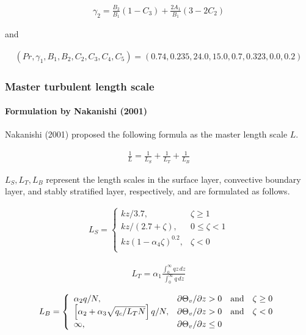 \begin{eqnarray}\gamma_2=\frac{B_2}{B_1}\left(1-C_3\right)+\frac{2A_1}{B_1}\left(3-2C_2\right)\end{eqnarray}

and

\begin{eqnarray}
(Pr,\gamma_1,B_1,B_2,C_2,C_3,C_4,C_5)=(0.74,0.235,24.0,15.0,0.7,0.323,0.0,0.2)
\end{eqnarray}

\hypertarget{master-turbulent-length-scale}{%
\subsubsection{Master turbulent length
scale}\label{master-turbulent-length-scale}}

\hypertarget{formulation-by-nakanishi-2001}{%
\paragraph{Formulation by Nakanishi
(2001)}\label{formulation-by-nakanishi-2001}}

Nakanishi (2001) proposed the following formula as the master length
scale \(L\).

\begin{eqnarray}\frac{1}{L}=\frac{1}{L_S}+\frac{1}{L_T}+\frac{1}{L_B} \label{1} \end{eqnarray}

\(L_S, L_T, L_B\) represent the length scales in the surface layer,
convective boundary layer, and stably stratified layer, respectively,
and are formulated as follows.

\begin{eqnarray}
L_S=\left\{
    \begin{array}{lr}
      kz/3.7, &\zeta\ge 1\\
      kz/(2.7+\zeta), &0\le\zeta< 1\\
      kz(1-\alpha_4\zeta)^{0.2}, &\zeta< 0\\
    \end{array}
  \right.
\end{eqnarray}

\begin{eqnarray}L_T=\alpha_1\frac{\displaystyle \int_0^\infty{qz}\,dz}{\displaystyle \int_0^\infty{q}\,dz}\end{eqnarray}

\begin{eqnarray}
L_B=\left\{
    \begin{array}{ll}
      \alpha_2 q/N, &\partial\Theta_v/\partial z> 0 \quad\rm{and}\quad\zeta\ge 0\\
      \left[\alpha_2+\alpha_3\sqrt{q_c/L_TN}\right]q/N, &\partial\Theta_v/\partial z> 0 \quad\rm{and}\quad\zeta< 0\\
      \infty, &\partial\Theta_v/\partial z\le 0\\
    \end{array}
  \right.
\end{eqnarray}

